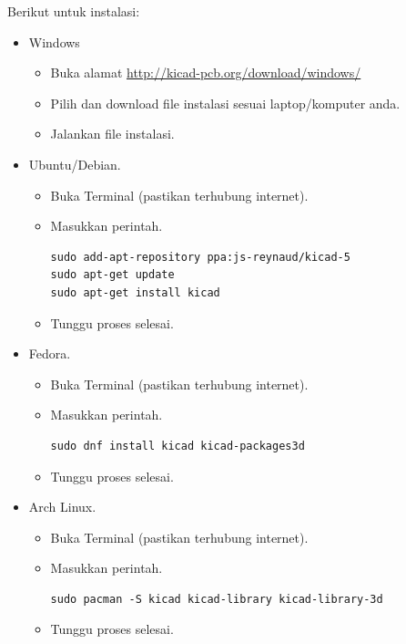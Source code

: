 \documentclass[12pt,]{article}
\begin{document}
	Berikut untuk instalasi:
	\begin{itemize}
		\item Windows
		\begin{itemize}
			\item Buka alamat \url{http://kicad-pcb.org/download/windows/}
			\item Pilih dan download file instalasi sesuai laptop/komputer anda.
			\item Jalankan file instalasi.
		\end{itemize}
	
		\item Ubuntu/Debian.
		\begin{itemize}
			\item Buka Terminal (pastikan terhubung internet).
			\item Masukkan perintah.
			\begin{verbatim}
sudo add-apt-repository ppa:js-reynaud/kicad-5
sudo apt-get update
sudo apt-get install kicad
			\end{verbatim}
			\item Tunggu proses selesai.
		\end{itemize}
		
		\item Fedora.
		\begin{itemize}
			\item Buka Terminal (pastikan terhubung internet).
			\item Masukkan perintah.
			\begin{verbatim}
sudo dnf install kicad kicad-packages3d
			\end{verbatim}
			\item Tunggu proses selesai.
		\end{itemize}
		
		\item Arch Linux.
		\begin{itemize}
			\item Buka Terminal (pastikan terhubung internet).
			\item Masukkan perintah.
			\begin{verbatim}
sudo pacman -S kicad kicad-library kicad-library-3d
			\end{verbatim}
			\item Tunggu proses selesai.
		\end{itemize}
		
	\end{itemize}
\end{document}

